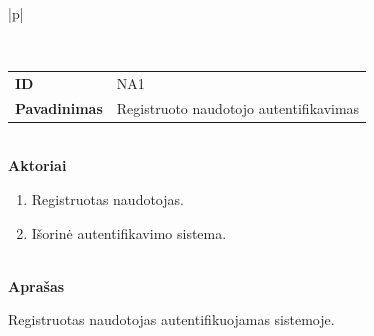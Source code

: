 \begin{center}
    \begin{longtable}{|p{\textwidth}|}
    \caption{Tekstinio naudojimo atvejo pavyzdys}
	\label{tab:text_use_cases_login}
	\\ \hline
    \begin{tabular}{@{}p{3.5cm}p{12cm}}
    	\\
    	\textbf{ID} & NA1
    	\\
    	\textbf{Pavadinimas} & Registruoto naudotojo autentifikavimas
    	\\
    \end{tabular}
    \\
    \textbf{Aktoriai}
    \begin{enumerate}
    	\item Registruotas naudotojas.
    	\item Išorinė autentifikavimo sistema.
	\end{enumerate}
    \\
    \textbf{Aprašas}

    Registruotas naudotojas autentifikuojamas sistemoje.


\end{longtable}
\end{center}
